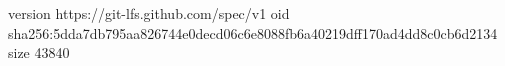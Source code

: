 version https://git-lfs.github.com/spec/v1
oid sha256:5dda7db795aa826744e0decd06c6e8088fb6a40219dff170ad4dd8c0cb6d2134
size 43840
